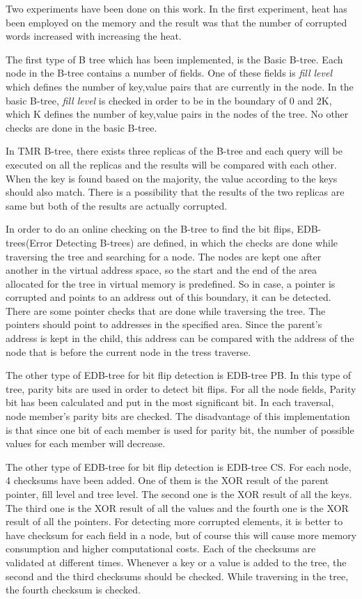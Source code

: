 \documentclass[12pt]{report}
\begin{document}
Two experiments have been done on this work. In the first experiment, heat has been employed on the memory and the result was that the number of corrupted words increased with increasing the heat.

The first type of B tree which has been implemented, is the Basic B-tree. Each node in the B-tree contains a number of fields. One of these fields is \textit {fill level} which defines the number of key,value pairs that are currently in the node. In the basic B-tree, \textit {fill level} is checked in order to be in the boundary of 0 and 2K, which K defines the number of key,value pairs in the nodes of the tree. No other checks are done in the basic B-tree.

In TMR B-tree, there exists three replicas of the B-tree and each query will be executed on all the replicas and the results will be compared with each other. When the key is found based on the majority, the value according to the keys should also match. There is a possibility that the results of the two replicas are same but both of the results are actually corrupted.

In order to do an online checking on the B-tree to find the bit flips, EDB-trees(Error Detecting B-trees) are defined, in which the checks are done while traversing the tree and searching for a node. The nodes are kept one after another in the virtual address space, so the start and the end of the area allocated for the tree in virtual memory is predefined. So in case, a pointer is corrupted and points to an address out of this boundary, it can be detected. There are some pointer checks that are done while traversing the tree. The pointers should point to addresses in the specified area. Since the parent's address is kept in the child, this address can be compared with the address of the node that is before the current node in the tress traverse.

The other type of EDB-tree for bit flip detection is EDB-tree PB. In this type of tree, parity bits are used in order to detect bit flips. For all the node fields, Parity bit has been calculated and put in the most significant bit. In each traversal, node member's parity bits are checked. The disadvantage of this implementation is that since one bit of each member is used for parity bit, the number of possible values for each member will decrease.

The other type of EDB-tree for bit flip detection is EDB-tree CS. For each node, 4 checksums have been added. One of them is the XOR result of the parent pointer, fill level and tree level. The second one is the XOR result of all the keys. The third one is the XOR result of all the values and the fourth one is the XOR result of all the pointers. For detecting more corrupted elements, it is better to have checksum for each field in a node, but of course this will cause more memory consumption and higher computational costs. Each of the checksums are validated at different times. Whenever a key or a value is added to the tree, the second and the third checksums should be checked. While traversing in the tree, the fourth checksum is checked.
\end{document}
